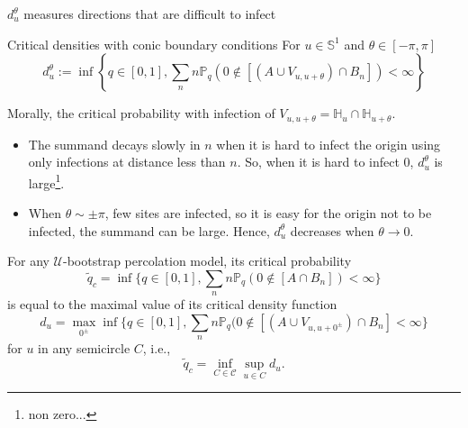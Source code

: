 
\begin{frame}{$d_u^\theta$ measures directions that are difficult to infect}
	\begin{block}{Critical densities with conic boundary conditions}
		For $u\in \mathbb{S}^1$ and $\theta\in[-\pi, \pi]$
		$$d_u^\theta := \inf\left\{q\in[0,1], \sum_n n\mathbb{P}_q(0\not\in [(A\cup V_{u,u+\theta})\cap B_n]) < \infty\right\}$$
	\end{block}
	Morally, the critical probability with infection of $V_{u,u+\theta} = \mathbb{H}_u \cap \mathbb{H}_{u+\theta}$. 
	\begin{itemize}
		\item The summand decays slowly in $n$ when it is hard to infect the origin using only infections at distance less than $n$. So, when it is hard to infect 0,  $d_u^\theta$ is large\footnote{non zero...}.
		\item When $\theta \sim \pm \pi$, few sites are infected, so it is easy for the origin not to be infected, the summand can be large. Hence, $d_u^\theta$ decreases when $\theta\to 0$.
	\end{itemize}
\end{frame}




\begin{frame}

	\begin{theorem}
		For any $\mathcal{U}$-bootstrap percolation model, its critical probability
		\begin{equation*}
			\tilde q_c = \inf\{q\in[0,1], \sum_n n\mathbb{P}_q(0\not\in [A\cap B_n]) < \infty\}
		\end{equation*}
		is equal to the maximal value of its critical density function
		\begin{equation*}
			d_u = \max_{0^\pm} \inf\{q\in[0,1], \sum_n n\mathbb{P}_q(0\not\in[(A\cup V_{u, u + 0^\pm})\cap B_n] < \infty\}
		\end{equation*}
		for $u$ in any semicircle $C$, i.e.,
		\begin{equation*}
			\tilde q_c = \inf_{C\in \mathcal{C}} \sup_{u\in C} d_u.
		\end{equation*}

	\end{theorem}

\end{frame}


